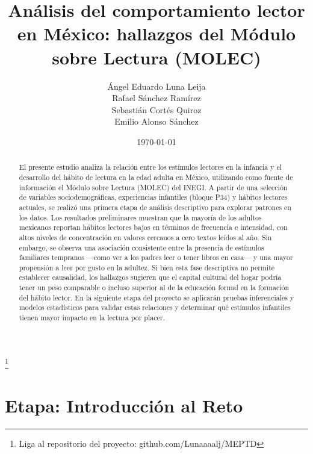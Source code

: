 \documentclass[aps,reprint]{revtex4-2}
\begin{document}
\title{Análisis del comportamiento lector en México: hallazgos del Módulo sobre Lectura (MOLEC)}\thanks{Liga al repositorio del proyecto: github.com/Lunaaaalj/MEPTD}
\author{Ángel Eduardo Luna Leija\\Rafael Sánchez Ramírez\\Sebastián Cortés Quiroz\\Emilio Alonso Sánchez}
\date{\today}
\begin{abstract}
El presente estudio analiza la relación entre los estímulos lectores en la infancia y el desarrollo del hábito de lectura en la edad adulta en México, utilizando como fuente de información el Módulo sobre Lectura (MOLEC) del INEGI. A partir de una selección de variables sociodemográficas, experiencias infantiles (bloque P34) y hábitos lectores actuales, se realizó una primera etapa de análisis descriptivo para explorar patrones en los datos. Los resultados preliminares muestran que la mayoría de los adultos mexicanos reportan hábitos lectores bajos en términos de frecuencia e intensidad, con altos niveles de concentración en valores cercanos a cero textos leídos al año. Sin embargo, se observa una asociación consistente entre la presencia de estímulos familiares tempranos —como ver a los padres leer o tener libros en casa— y una mayor propensión a leer por gusto en la adultez. Si bien esta fase descriptiva no permite establecer causalidad, los hallazgos sugieren que el capital cultural del hogar podría tener un peso comparable o incluso superior al de la educación formal en la formación del hábito lector. En la siguiente etapa del proyecto se aplicarán pruebas inferenciales y modelos estadísticos para validar estas relaciones y determinar qué estímulos infantiles tienen mayor impacto en la lectura por placer.
\end{abstract}
\maketitle
\tableofcontents



\section{Etapa: Introducción al Reto}
\end{document}
